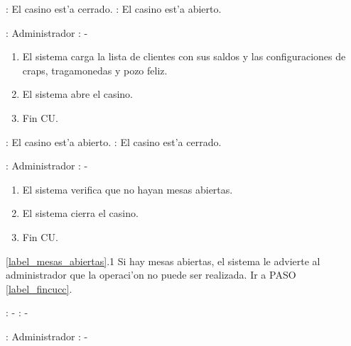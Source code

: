 : El casino est'a cerrado. \newline
\indent{}: El casino est'a abierto.

: Administrador \newline
\indent{}: -

\begin{enumerate}
\item El sistema carga la lista de clientes con sus saldos y las configuraciones de craps, tragamonedas y pozo feliz.
\item El sistema abre el casino.
\item Fin CU.
\end{enumerate}




: El casino est'a abierto. \newline
\indent{}: El casino est'a cerrado.

: Administrador \newline
\indent{}: -

\begin{enumerate}
\item El sistema verifica que no hayan mesas abiertas.
\item El sistema cierra el casino. \label{label_mesas_abiertas}
\item Fin CU. \label{label_fincucc}
\end{enumerate}


\ref{label_mesas_abiertas}.1 Si hay mesas abiertas, el sistema le advierte al administrador que la operaci'on no puede ser realizada. Ir a PASO \ref{label_fincucc}.




: - \newline
\indent{}: -

: Administrador \newline
\indent{}: -

